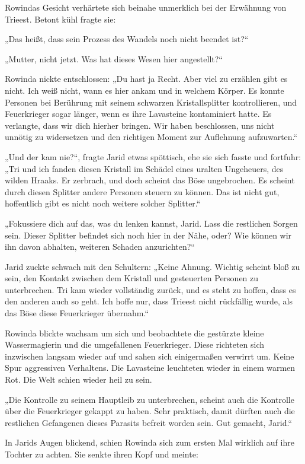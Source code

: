 Rowindas Gesicht verhärtete sich beinahe unmerklich bei der Erwähnung von Trieest. Betont kühl fragte sie:

„Das heißt, dass sein Prozess des Wandels noch nicht beendet ist?“

„Mutter, nicht jetzt. Was hat dieses Wesen hier angestellt?“

Rowinda nickte entschlossen: „Du hast ja Recht. Aber viel zu erzählen gibt es nicht. Ich weiß nicht, wann es hier ankam und in welchem Körper. Es konnte Personen bei Berührung mit seinem schwarzen Kristallsplitter kontrollieren, und Feuerkrieger sogar länger, wenn es ihre Lavasteine kontaminiert hatte. Es verlangte, dass wir dich hierher bringen. Wir haben beschlossen, uns nicht unnötig zu widersetzen und den richtigen Moment zur Auflehnung aufzuwarten.“

„Und der kam nie?“, fragte Jarid etwas spöttisch, ehe sie sich fasste und fortfuhr: „Tri und ich fanden diesen Kristall im Schädel eines uralten Ungeheuers, des wilden Hraaks. Er zerbrach, und doch scheint das Böse ungebrochen. Es scheint durch diesen Splitter andere Personen steuern zu können. Das ist nicht gut, hoffentlich gibt es nicht noch weitere solcher Splitter.“

„Fokussiere dich auf das, was du lenken kannst, Jarid. Lass die restlichen Sorgen sein. Dieser Splitter befindet sich noch hier in der Nähe, oder? Wie können wir ihn davon abhalten, weiteren Schaden anzurichten?“

Jarid zuckte schwach mit den Schultern: „Keine Ahnung. Wichtig scheint bloß zu sein, den Kontakt zwischen dem Kristall und gesteuerten Personen zu unterbrechen. Tri kam wieder vollständig zurück, und es steht zu hoffen, dass es den anderen auch so geht. Ich hoffe nur, dass Trieest nicht rückfällig wurde, als das Böse diese Feuerkrieger übernahm.“

Rowinda blickte wachsam um sich und beobachtete die gestürzte kleine Wassermagierin und die umgefallenen Feuerkrieger. Diese richteten sich inzwischen langsam wieder auf und sahen sich einigermaßen verwirrt um. Keine Spur aggressiven Verhaltens. Die Lavasteine leuchteten wieder in einem warmen Rot. Die Welt schien wieder heil zu sein.

„Die Kontrolle zu seinem Hauptleib zu unterbrechen, scheint auch die Kontrolle über die Feuerkrieger gekappt zu haben. Sehr praktisch, damit dürften auch die restlichen Gefangenen dieses Parasits befreit worden sein. Gut gemacht, Jarid.“

In Jarids Augen blickend, schien Rowinda sich zum ersten Mal wirklich auf ihre Tochter zu achten. Sie senkte ihren Kopf und meinte:

